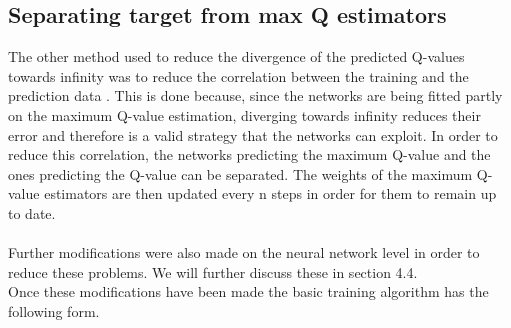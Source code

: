 \subsection{Separating target from max Q estimators}
The other method used to reduce the divergence of the predicted Q-values towards infinity was to reduce the correlation between the training and the prediction data \cite{Mnih2015}. This is done because, since the networks are being fitted partly on the maximum Q-value estimation, diverging towards infinity reduces their error and therefore is a valid strategy that the networks can exploit. In order to reduce this correlation, the networks predicting the maximum Q-value and the ones predicting the Q-value can be separated. The weights of the maximum Q-value estimators are then updated every n steps in order for them to remain up to date.\\
\mbox{}\\
Further modifications were also made on the neural network level in order to reduce these problems. We will further discuss these in section 4.4.\\
Once these modifications have been made the basic training algorithm has the following form.

